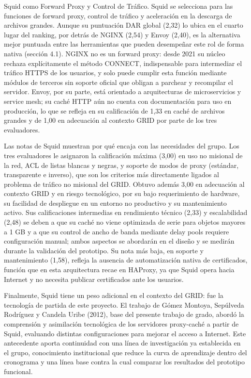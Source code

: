 \begin{enumerate}[label=\textbf{\arabic*.}, leftmargin=*, itemsep=0.9em]
  Squid como Forward Proxy y Control de Tráfico. Squid se selecciona para las funciones de forward proxy, control de tráfico y aceleración en la descarga de archivos grandes. Aunque su puntuación DAR global (2,32) lo ubica en el cuarto lugar del ranking, por detrás de NGINX (2,54) y Envoy (2,40), es la alternativa mejor puntuada entre las herramientas que pueden desempeñar este rol de forma nativa (sección 4.1). NGINX no es un forward proxy: desde 2021 su núcleo rechaza explícitamente el método CONNECT, indispensable para intermediar el tráfico HTTPS de los usuarios, y solo puede cumplir esta función mediante módulos de terceros sin soporte oficial que obligan a parchear y recompilar el servidor. Envoy, por su parte, está orientado a arquitecturas de microservicios y service mesh; su caché HTTP aún no cuenta con documentación para uso en producción, lo que se refleja en su calificación de 1,33 en caché de archivos grandes y de 1,00 en adecuación al contexto GRID por parte de los tres evaluadores.

  Las notas de Squid muestran por qué encaja con las necesidades del grupo. Los tres evaluadores le asignaron la calificación máxima (3,00) en uso no misional de la red, ACL de listas blancas y negras, y soporte de modos de proxy (estándar, transparente e inverso), que son los criterios más directamente ligados al problema de tráfico no misional del GRID. Obtuvo además 3,00 en adecuación al contexto GRID y en riesgo tecnológico, por su bajo requerimiento de hardware, su facilidad de despliegue en un entorno no productivo y su mantenimiento activo. Sus calificaciones intermedias en rendimiento técnico (2,33) y escalabilidad (2,48) se deben a que su caché no viene optimizada de serie para objetos mayores a 1 GB y a que su control de ancho de banda mediante delay pools requiere configuración manual; ambos aspectos se abordarán en el diseño y se medirán durante la validación del prototipo. Su nota más baja, en soporte y mantenimiento (1,58), refleja la ausencia de automatización nativa de certificados, función que en esta arquitectura recae en HAProxy, ya que Squid opera hacia Internet y no necesita publicar certificados ante los usuarios.

  Finalmente, Squid tiene un peso adicional en el contexto del GRID: fue la tecnología de partida de este proyecto. El trabajo de Gómez Montoya, Sepúlveda Rodríguez y Candela Uribe (2012), base del presente trabajo de grado, abordó la comprensión y asimilación tecnológica de los servidores proxy-caché a partir de Squid, evaluando distintas configuraciones para mejorar el acceso a Internet. Este antecedente aporta continuidad con una línea de investigación ya establecida en el grupo, conocimiento institucional que reduce la curva de aprendizaje dentro del cronograma y una línea base contra la cual comparar los resultados del prototipo funcional.


\end{enumerate}
